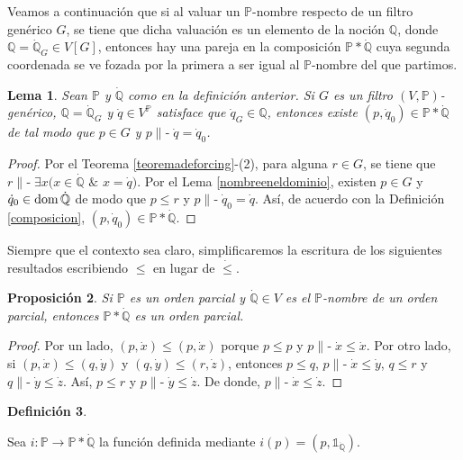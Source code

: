 \documentclass[11pt]{unam_tesis1}
\theoremstyle{MyThmStyle}
\theoremstyle{definition}
\newtheorem{definition}{Definici\'on}[chapter]
\theoremstyle{plain}
\newtheorem{lemma}[definition]{Lema}
\newtheorem{proposition}[definition]{Proposici\'on}
\theoremstyle{remark}
\def\dom{\mathop{\rm dom}\nolimits}
\def\forces{\mathop{\parallel\!\!\!-}\nolimits}
\let\Vdash\forces
\let\leq\leqslant
\begin{document}
Veamos a continuaci\'on que si al valuar un $\mathbb P$-nombre respecto de un filtro gen\'erico $G$, se tiene que dicha valuaci\'on es un elemento de la noci\'on $\mathbb Q$, donde $\mathbb Q=\dot{\mathbb Q}_G\in V[G]$, entonces hay una pareja en la composici\'on $\mathbb P*\dot{\mathbb Q}$ cuya segunda coordenada se ve fozada por la primera a ser igual al $\mathbb P$-nombre del que partimos.

\begin{lemma}\label{caballito}
Sean $\mathbb P$ y $\dot{\mathbb Q}$ como en la definici\'on anterior. Si $G$ es un filtro $(V,\mathbb P)$-gen\'erico, $\mathbb Q=\dot{\mathbb Q}_G$ y $\dot q\in V^{\mathbb P}$ satisface que $\dot q_G\in \mathbb Q$, entonces existe $(p,\dot q_0) \in \mathbb P*\dot{\mathbb Q}$ de tal modo que $p\in G$ y $p\Vdash\dot q = \dot q_0$.
\end{lemma}


\begin{proof}
Por el Teorema \ref{teoremadeforcing}-(2), para alguna $r\in G$, se tiene que $r\Vdash \exists x(x\in \dot{\mathbb Q}$ $\&$ $x=\dot q)$. Por el Lema \ref{nombreeneldominio}, existen $p\in G$ y $\dot q_0\in \dom \dot{\mathbb Q}$ de modo que $p\leq r$ y $p\Vdash \dot q_0=\dot q$. As\'i, de acuerdo con la Definici\'on \ref{composicion}, $(p,\dot q_0)\in \mathbb P*\dot{\mathbb Q}$.
\end{proof}

Siempre que el contexto sea claro, simplificaremos la escritura de los siguientes resultados escribiendo $\leq $ en lugar de $\dot{\leq }$.

\begin{proposition}

Si $\mathbb P$ es un orden parcial y $\dot{\mathbb Q}\in V$ es el $\mathbb P$-nombre de un orden parcial, entonces $\mathbb P*\dot{\mathbb Q}$ es un orden parcial.

\end{proposition}
 
\begin{proof}
Por un lado, $(p,\dot{x})\leq (p,\dot{x})$ porque $p\leq p$ y $p\Vdash \dot{x}\leq \dot{x}$. Por otro lado, si $(p,\dot x)\leq (q,\dot{y})$ y $(q,\dot{y})\leq (r,\dot z)$, entonces $p\leq q$, $p\Vdash \dot{x}\leq \dot{y}$, $q\leq r$ y $q\Vdash \dot{y}\leq \dot{z}$. As\'i, $p\leq r$ y $p\Vdash \dot{y}\leq \dot{z}$. De donde, $p\Vdash \dot{x}\leq \dot{z}$.
\end{proof}

\begin{definition}\label{inclusioncomposicion}

Sea $i:\mathbb P\to \mathbb P*\dot{\mathbb Q}$ la funci\'on definida mediante $i(p)=(p,\mathds 1_{\dot{\mathbb Q}})$.

\end{definition}
\end{document}
